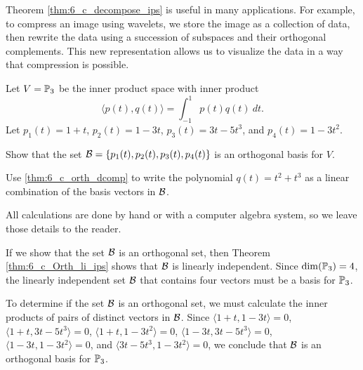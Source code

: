 Theorem \ref{thm:6_c_decompose_ips} is useful in many applications. For example, to compress an image using wavelets, we store the image as a collection of data, then rewrite the data using a succession of subspaces and their orthogonal complements.  This new representation allows us to visualize the data in a way that compression is possible. 

\label{sec:inner_prod_exam}

\ExampleIntro

\begin{example} Let $V = \mathbb{P}_3$ be the inner product space with inner product 
\[\langle p(t), q(t) \rangle = \int_{-1}^1 p(t)q(t) \ dt.\]
Let $p_1(t) = 1+t$, $p_2(t) = 1-3t$, $p_3(t) = 3t-5t^3$, and $p_4(t) = 1-3t^2$. 
\ba
\item Show that the set $\mathcal{B} = \{p_1(t), p_2(t), p_3(t), p_4(t)\}$ is an orthogonal basis for $V$.

\item  Use  \ref{thm:6_c_orth_dcomp} to write the polynomial $q(t) = t^2+t^3$ as a linear combination of the basis vectors in $\mathcal{B}$. 

\ea

\ExampleSolution All calculations are done by hand or with a computer algebra system, so we leave those details to the reader. 
\ba
\item If we show that the set $\mathcal{B}$ is an orthogonal set, then Theorem \ref{thm:6_c_Orth_li_ips} shows that $\mathcal{B}$ is linearly independent. Since $\dim(\mathbb{P}_3) = 4$, the linearly independent set $\mathcal{B}$ that contains four vectors must be a basis for $\mathbb{P}_3$. 

To determine if the set $\mathcal{B}$ is an orthogonal set, we must calculate the inner products of pairs of distinct vectors in $\mathcal{B}$. Since $\langle 1+t,1-3t \rangle = 0$, $\langle 1+t,3t-5t^3 \rangle = 0$, $\langle 1+t,1-3t^2 \rangle = 0$, $\langle 1-3t,3t-5t^3 \rangle = 0$, $\langle 1-3t,1-3t^2 \rangle = 0$, and $\langle 3t-5t^3,1-3t^2 \rangle = 0$, we conclude that $\mathcal{B}$ is an orthogonal basis for $\mathbb{P}_3$. 


\end{example}
